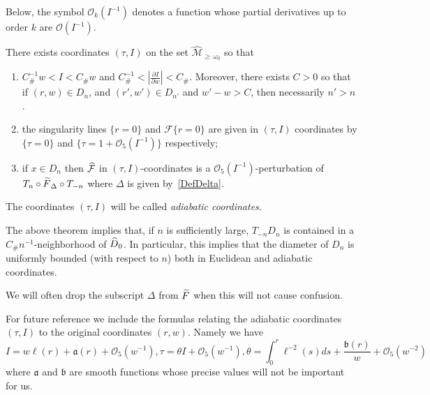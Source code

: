 \documentclass[AHL, Unicode, longabstracts,published]{cedram}
\newcommand{\ct}{r}
\newcommand{\const}{C_\#}
\newcommand{\inv}{^{-1}}
\newcommand{\fka}{\mathfrak{a}}
\newcommand{\fkb}{\mathfrak{b}}
\newcommand{\cO}{\mathcal{O}}
\newcommand{\cm}{\mathcal{F}}
\newcommand{\csp}{\mathcal{M}}
\newcommand{\cmp}{\hat\cm}
\newcommand{\cspil}[1]{\widehat{\csp}_{\ge\,#1}}
\newcommand{\law}[1]{\omega_{#1}}
\newcommand{\Dom}{D}
\newcommand{\hDom}{\hat D}
\newcommand{\nfr}{\tilde F}
\newcommand{\tsl}[1]{T_{#1}}
\newcommand*{\relabel}{\renewcommand{\labelenumi}{(\theenumi)}}
\newcommand*{\alphenumi}{\renewcommand*{\theenumi}{\alph{enumi}}\relabel}
\let\oldtilde\tilde
\renewcommand*{\tilde}[1]{\mathchoice{\widetilde{#1}}{\widetilde{#1}}{\oldtilde{#1}}{\oldtilde{#1}}}
\let\oldhat\hat
\renewcommand*{\hat}[1]{\mathchoice{\widehat{#1}}{\widehat{#1}}{\oldhat{#1}}{\oldhat{#1}}}
\begin{document}
Below, the symbol $\cO_k(I^{-1})$ denotes a function whose partial derivatives up to order $k$ are $\cO(I^{-1})$.
\begin{theo}\label{t_normalForm}
There exists coordinates $(\tau,I)$ on the set $\cspil{\law0}$ so that
\begin{enumerate}\alphenumi
\item\label{theo4.9.1} $\const\inv w < I < \const w$ and $\const\inv < |\frac{\partial I}{\partial w}| < \const$. Moreover, there exists $C > 0$ so that if $(r,w)\in D_n$, and $(r',w')\in D_{n'}$ and $w' -w > C$, then necessarily $n' > n$.
\item\label{theo4.9.2} the singularity lines $\{\ct = 0\}$ and $\cm \{\ct = 0\}$ are given in $(\tau, I)$ coordinates by $\{\tau = 0\}$ and $\{\tau = 1+\cO_5\left(I^{-1}\right)\}$ respectively;
\item\label{theo4.9.3} if $x\in D_n$ then $\cmp$ in $(\tau,I)$-coordinates is a $\cO_5(I\inv)$-perturbation of $\tsl n\circ\nfr_\Delta\circ\tsl {-n}$ where $\Delta$ is given by~\eqref{DefDelta}.
\end{enumerate}
\end{theo} The coordinates $(\tau, I)$ will be called \emph{adiabatic coordinates}.


\begin{rema}\label{remark_diam-domain}
The above theorem implies that, if $n$ is sufficiently large, $\tsl{-n}\Dom_n$ is contained in a $\const n\inv$-neighborhood of $\hDom_0$. In particular, this implies that the diameter of $\Dom_{n}$ is uniformly bounded (with respect to $n$) both in Euclidean and adiabatic coordinates.
\end{rema}

We will often drop the subscript $\Delta$ from $\nfr$ when this will not cause confusion.

For future reference we include the formulas relating the adiabatic coordinates $(\tau, I)$ to the original coordinates $(\ct, w).$ Namely we have
\begin{subequations}\label{ChCoordIT}
\begin{equation}
I=w \ell(\ct) +\fka(\ct)+\cO_5(w^{-1}),
\end{equation}
\begin{equation}
\tau= \theta I+\cO_5(w^{-1}),
\end{equation}
\begin{equation}
\theta=\int_0^r \ell^{-2}(s)
ds+\frac{\fkb(\ct)}{w}+\cO_5(w^{-2})
\end{equation}
\end{subequations}
where $\fka$ and $\fkb$ are smooth functions whose precise values will not be important for us.
\end{document}
